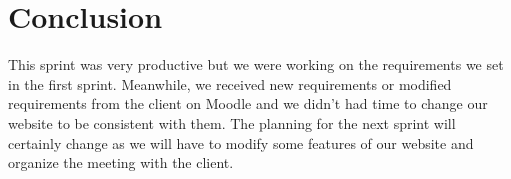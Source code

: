 \section{Conclusion}

This sprint was very productive but we were working on the requirements we set in the first sprint. Meanwhile, we received new requirements or modified requirements from the client on Moodle and we didn't had time to change our website to be consistent with them. The planning for the next sprint will certainly change as we will have to modify some features of our website and organize the meeting with the client.
